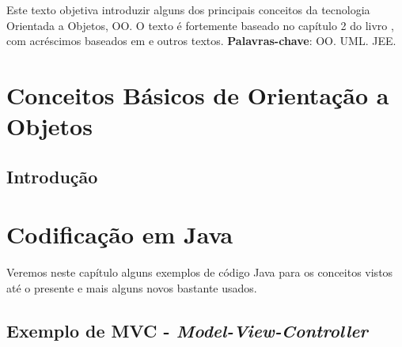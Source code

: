 \documentclass[
	11pt,				%
	openright,
	twoside,			%
	a4paper,			%
	english,			%
	french,
	brazil,				%
	sumario=tradicional
	]{abntex2}
\begin{document}

\frenchspacing 


\imprimircapa

\listoffigures*
\newpage 

\listoftables*
\newpage

\tableofcontents*
\newpage 

\begin{resumoumacoluna}
Este texto objetiva introduzir alguns dos principais conceitos da tecnologia Orientada a Objetos, OO.
O texto é fortemente baseado no capítulo 2 do livro \cite{Ambler:TOP:3ed}, com acréscimos baseados em \cite{uml:j2ee} e outros textos.
%
\vspace{\onelineskip}
\noindent
\textbf{Palavras-chave}: OO. UML. JEE.
\end{resumoumacoluna}

\textual


\chapter{Conceitos Básicos de Orientação a Objetos}
\section{Introdução}



\chapter{Codificação em Java}

Veremos neste capítulo alguns exemplos de código Java para os conceitos vistos até o presente e mais alguns novos bastante usados.

\section{Exemplo de MVC - \emph{Model-View-Controller}}
\end{document}
